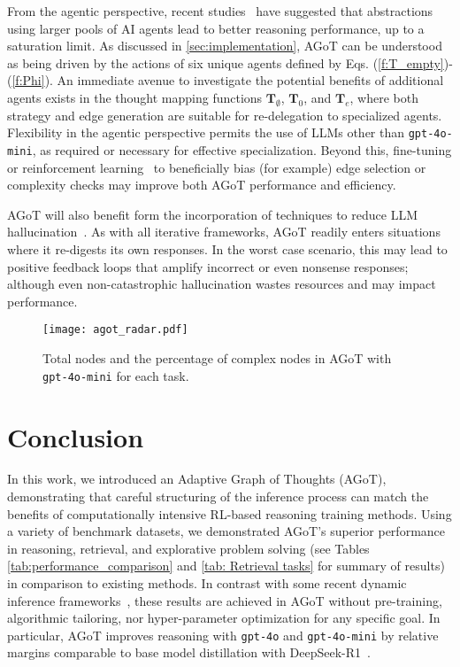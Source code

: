 \documentclass{article}
\begin{document}
From the agentic perspective, recent studies~\citep{li2024more} have suggested that abstractions using larger pools of AI agents lead to better reasoning performance, up to a saturation limit. As discussed in \autoref{sec:implementation}, AGoT can be understood as being driven by the actions of six unique agents defined by Eqs. (\ref{f:T_empty})-(\ref{f:Phi}). An immediate avenue to investigate the potential benefits of additional agents exists in the thought mapping functions $\mathbf{T}_\emptyset$, $\mathbf{T}_0$, and $\mathbf{T}_e$, where both strategy and edge generation are suitable for re-delegation to specialized agents. Flexibility in the agentic perspective permits the use of LLMs other than \texttt{gpt-4o-mini}, as required or necessary for effective specialization. Beyond this, fine-tuning or reinforcement learning~\citep{wang2024reinforcementlearningenhancedllms} to beneficially bias (for example) edge selection or complexity checks may improve both AGoT performance and efficiency.

AGoT will also benefit form the incorporation of techniques to reduce LLM hallucination~\citep{tonmoy2024comprehensivesurveyhallucinationmitigation}. As with all iterative frameworks, AGoT readily enters situations where it re-digests its own responses. In the worst case scenario, this may lead to positive feedback loops that amplify incorrect or even nonsense responses; although even non-catastrophic hallucination wastes resources and may impact performance.

\begin{figure}[t]
    \centering
    \texttt{[image: agot\_radar.pdf]}
    \caption{Total nodes and the percentage of complex nodes in AGoT with \texttt{gpt-4o-mini} for each task.}
    \label{fig:task-performance-breakdown}
\end{figure}

\section{Conclusion}


In this work, we introduced an Adaptive Graph of Thoughts (AGoT), demonstrating that careful structuring of the inference process can match the benefits of computationally intensive RL-based reasoning training methods. Using a variety of benchmark datasets, we demonstrated AGoT's superior performance in reasoning, retrieval, and explorative problem solving (see Tables \ref{tab:performance_comparison} and \ref{tab: Retrieval tasks} for summary of results) in comparison to existing methods. In contrast with some recent dynamic inference frameworks~\citep{ning2024dgotdynamicgraphthoughts,zhu2024redeltoolkitllmpoweredrecursive,wang2024tdagmultiagentframeworkbased}, these results are achieved in AGoT without pre-training, algorithmic tailoring, nor hyper-parameter optimization for any specific goal. In particular, AGoT improves reasoning with \texttt{gpt-4o} and \texttt{gpt-4o-mini} by relative margins comparable to base model distillation with DeepSeek-R1~\citep{deepseekai2025deepseekr1incentivizingreasoningcapability}.
\end{document}
